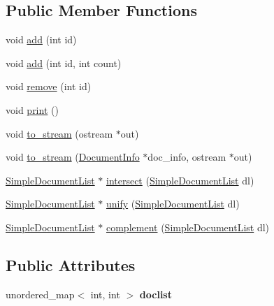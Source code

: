 \subsection*{Public Member Functions}
\begin{DoxyCompactItemize}
\item 
void \hyperlink{class_simple_document_list_ac7f79b25800a962564204a848faa1699}{add} (int id)
\item 
void \hyperlink{class_simple_document_list_aa5620d3d5d6de675788d38031c206c65}{add} (int id, int count)
\item 
void \hyperlink{class_simple_document_list_ad4d35ae4892155bc9dca9c528412c261}{remove} (int id)
\item 
void \hyperlink{class_simple_document_list_a751b699421e4e521703ff4caa7777444}{print} ()
\item 
void \hyperlink{class_simple_document_list_a761086b43ea9cf8e3a884377238be7f8}{to\-\_\-stream} (ostream $\ast$out)
\item 
void \hyperlink{class_simple_document_list_a45659deca249881d873cd9cb7826e6a9}{to\-\_\-stream} (\hyperlink{class_document_info}{Document\-Info} $\ast$doc\-\_\-info, ostream $\ast$out)
\item 
\hyperlink{class_simple_document_list}{Simple\-Document\-List} $\ast$ \hyperlink{class_simple_document_list_a6e20bc294b6c25a11669e058b60b5a23}{intersect} (\hyperlink{class_simple_document_list}{Simple\-Document\-List} dl)
\item 
\hyperlink{class_simple_document_list}{Simple\-Document\-List} $\ast$ \hyperlink{class_simple_document_list_a70e5a7941e0f8d19b2c80024303c7ddf}{unify} (\hyperlink{class_simple_document_list}{Simple\-Document\-List} dl)
\item 
\hyperlink{class_simple_document_list}{Simple\-Document\-List} $\ast$ \hyperlink{class_simple_document_list_a3766bef53e75da6d7da14dbd9ccd6aff}{complement} (\hyperlink{class_simple_document_list}{Simple\-Document\-List} dl)
\end{DoxyCompactItemize}
\subsection*{Public Attributes}
\begin{DoxyCompactItemize}
\item 
\hypertarget{class_simple_document_list_aed1123589c05a94eba961aae615096df}{unordered\-\_\-map$<$ int, int $>$ {\bfseries doclist}}\label{class_simple_document_list_aed1123589c05a94eba961aae615096df}

\end{DoxyCompactItemize}


